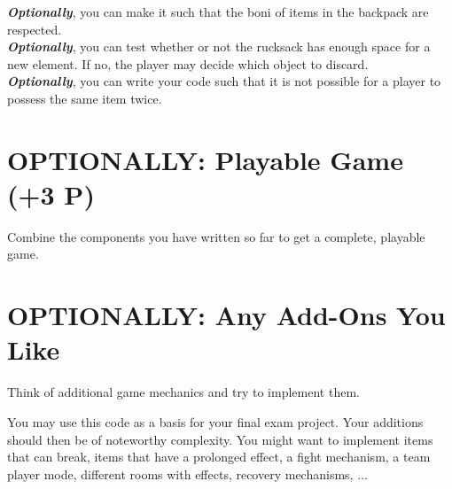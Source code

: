 \documentclass[
	english,
	fontsize=10pt,
	parskip=half,
	titlepage=true,
	DIV=12
]{scrartcl}
\begin{document}
\textbf{\emph{Optionally}}, you can make it such that the boni of items in the backpack are respected.\\
\textbf{\emph{Optionally}}, you can test whether or not the rucksack has enough space for a new element. If no, the player may decide which object to discard.\\
\textbf{\emph{Optionally}}, you can write your code such that it is not possible for a player to possess the same item twice.

\section{OPTIONALLY: Playable Game (+3 P)}
Combine the components you have written so far to get a complete, playable game.

\section{OPTIONALLY: Any Add-Ons You Like}
Think of additional game mechanics and try to implement them.

You may use this code as a basis for your final exam project. Your additions should then be of noteworthy complexity. You might want to implement items that can break, items that have a prolonged effect, a fight mechanism, a team player mode, different rooms with effects, recovery mechanisms, ...
\end{document}
